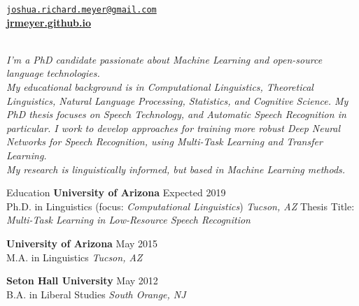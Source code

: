 \documentclass{resume} %
\begin{document}
\vspace{-.5cm}
\begin{center}
  \href{mailto:joshua.richard.meyer@gmail.com}{\nolinkurl{joshua.richard.meyer@gmail.com}}\\
  \href{https://jrmeyer.github.io}{\textbf{jrmeyer.github.io}} \\
  \href{https://github.com/JRMeyer}{\faGithub} \hspace{.25cm} \href{https://www.linkedin.com/in/josh-r-meyer/}{\faLinkedin} \\

\vspace{.05cm}

\textit{I'm a PhD candidate passionate about Machine Learning and open-source language technologies. \\ My educational background is in Computational Linguistics, Theoretical Linguistics, Natural Language Processing, Statistics, and Cognitive Science. My PhD thesis focuses on Speech Technology, and Automatic Speech Recognition in particular. I work to develop approaches for training more robust Deep Neural Networks for Speech Recognition, using Multi-Task Learning and Transfer Learning. \\ My research is linguistically informed, but based in Machine Learning methods. }

\end{center}

\vfill

\begin{rSection}{Education}
{\bf University of Arizona} \hfill {Expected 2019} \\ 
Ph.D. in Linguistics (focus: \textit{Computational Linguistics}) \hfill {\em Tucson, AZ}
Thesis Title: \textit{Multi-Task Learning in Low-Resource Speech Recognition}

{\bf University of Arizona} \hfill {May 2015} \\ 
M.A. in Linguistics \hfill {\em Tucson, AZ}

{\bf Seton Hall University} \hfill {May 2012} \\ 
B.A. in Liberal Studies  \hfill {\em South Orange, NJ} \\
\end{rSection}
\end{document}
